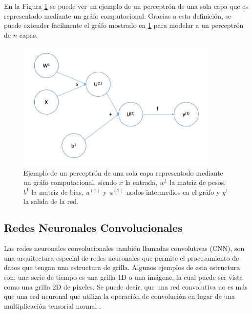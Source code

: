 	En la Figura \ref{fig:grafo-computacional} se puede ver un ejemplo de un perceptrón de una sola capa que es representado mediante un gráfo computacional. Gracias a esta definición, se puede extender facilmente el gráfo mostrado en \ref{fig:grafo-computacional} para modelar a un perceptrón de $n$ capas.
	
	\begin{figure}[h]
		\centering
		\includegraphics[width=10cm]{capitulo2/images/grafo}
		\caption{Ejemplo de un perceptrón de una sola capa representado mediante un gráfo computacional, siendo $x$ la entrada, $w^{1}$ la matriz de pesos, $b^{1}$ la matriz de bias, $u^{(1)}$ y $u^{(2)}$ nodos intermedios en el gráfo y $y^{1}$ la salida de la red.}
		\label{fig:grafo-computacional}
	\end{figure}

    
    \subsection{Redes Neuronales Convolucionales}
    
    Las redes neuronales convolucionales también llamadas convolutivas (CNN), son una arquitectura especial de redes neuronales que permite el procesamiento de datos que tengan una estructura de grilla. Algunos ejemplos de esta estructura son: una serie de tiempo es una grilla 1D o una imágene, la cual puede ser vista como una grilla 2D de pixeles. Se puede decir, que una red convolutiva no es más que una red neuronal que utiliza la operación de convolución en lugar de una multiplicación tensorial normal \cite{deeplearningbook}. \\
    
